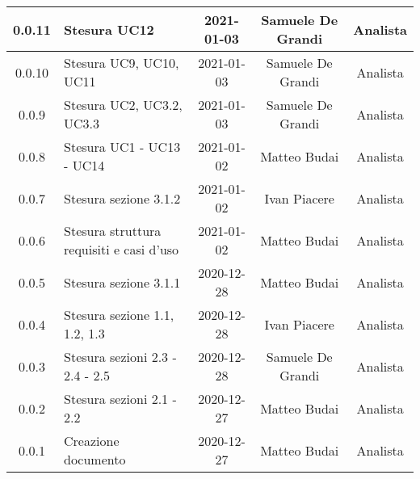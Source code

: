 \begin{center}
\begin{longtable}{|c|p{5cm}|c|c|c|}
		\hline
		0.0.11 & Stesura UC12  & 2021-01-03 & Samuele De Grandi & Analista \\
		\hline
	    0.0.10 & Stesura UC9, UC10, UC11  & 2021-01-03 & Samuele De Grandi & Analista \\
		\hline
		0.0.9 & Stesura UC2, UC3.2, UC3.3  & 2021-01-03 & Samuele De Grandi & Analista \\
		\hline
		0.0.8 & Stesura UC1 - UC13 - UC14 & 2021-01-02 & Matteo Budai & Analista \\
		\hline
		0.0.7 & Stesura sezione 3.1.2 & 2021-01-02 & Ivan Piacere & Analista\\
		\hline
		0.0.6 & Stesura struttura requisiti e casi d'uso & 2021-01-02 & Matteo Budai & Analista \\
		\hline
		0.0.5 & Stesura sezione 3.1.1 & 2020-12-28 & Matteo Budai & Analista \\
		\hline
		0.0.4 & Stesura sezione 1.1, 1.2, 1.3 & 2020-12-28 & Ivan Piacere & Analista \\
		\hline
		0.0.3 & Stesura sezioni 2.3 - 2.4 - 2.5 & 2020-12-28 & Samuele De Grandi & Analista \\
		\hline
		0.0.2 & Stesura sezioni 2.1 - 2.2 & 2020-12-27 & Matteo Budai & Analista \\
		\hline
		0.0.1 & Creazione documento & 2020-12-27 & Matteo Budai & Analista \\
		\hline
		
	\end{longtable}
\end{center}
